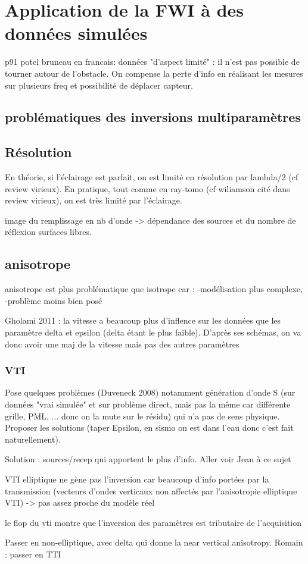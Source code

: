 \chapter{Application de la FWI à des données simulées}

p91 potel bruneau en francais: données "d'aspect limité" : il n'est pas possible de tourner autour de l'obstacle. On compense la perte d'info en réalisant les mesures sur plusieurs freq et possibilité de déplacer capteur.

\section{problématiques des inversions multiparamètres}



\section{Résolution}
En théorie, si l'éclairage est parfait, on est limité en résolution par lambda/2 (cf review virieux). En pratique, tout comme en ray-tomo (cf wiliamson cité dans review virieux), on est très limité par l'éclairage.

image du remplissage en nb d'onde -> dépendance des sources et du nombre de réflexion surfaces libres.

\section{anisotrope}

anisotrope est plus problématique que isotrope car : 
-modélisation plus complexe,
-problème moins bien posé

Gholami 2011 : la vitesse a beaucoup plus d'inflence sur les données que les paramètre delta et epsilon (delta étant le plus faible). D'après ses schémas, on va donc avoir une maj de la vitesse mais pas des autres paramètres

\subsection{VTI}
Pose quelques problèmes (Duveneck 2008) notamment génération d'onde S (sur données "vrai simulée"  et sur problème direct, mais pas la même car différente grille, PML, ... donc on la mute sur le résidu) qui n'a pas de sens physique. Proposer les solutions (taper Epsilon, en sismo on est dans l'eau donc c'est fait naturellement).


Solution : sources/recep qui apportent le plus d'info. Aller voir Jean à ce sujet


VTI elliptique ne gène pas l'inversion car beaucoup d'info portées par la transmission (vecteurs d'ondes verticaux non affectés par l'anisotropie elliptique VTI)  -> pas assez proche du modèle réel

le flop du vti montre que l'inversion des paramètres est tributaire de l'acquisition

Passer en non-elliptique, avec delta qui donne la near vertical anisotropy. Romain : passer en TTI

